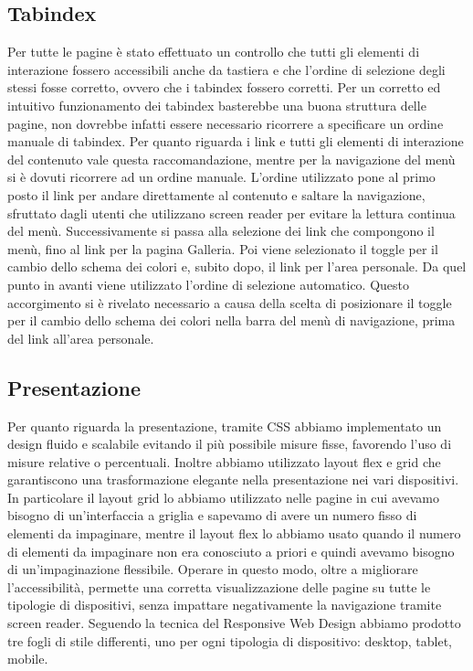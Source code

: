 \documentclass[a4paper]{article}
\begin{document}
	\subsection{Tabindex}
	Per tutte le pagine è stato effettuato un controllo che tutti gli elementi di interazione fossero accessibili anche da tastiera e che l'ordine di selezione degli stessi fosse corretto, ovvero che i tabindex fossero corretti. Per un corretto ed intuitivo funzionamento dei tabindex basterebbe una buona struttura delle pagine, non dovrebbe infatti essere necessario ricorrere a specificare un ordine manuale di tabindex. Per quanto riguarda i link e tutti gli elementi di interazione del contenuto vale questa raccomandazione, mentre per la navigazione del menù si è dovuti ricorrere ad un ordine manuale. L'ordine utilizzato pone al primo posto il link per andare direttamente al contenuto e saltare la navigazione, sfruttato dagli utenti che utilizzano screen reader per evitare la lettura continua del menù. Successivamente si passa alla selezione dei link che compongono il menù, fino al link per la pagina Galleria. Poi viene selezionato il toggle per il cambio dello schema dei colori e, subito dopo, il link per l'area personale. Da quel punto in avanti viene utilizzato l'ordine di selezione automatico. Questo accorgimento si è rivelato necessario a causa della scelta di posizionare il toggle per il cambio dello schema dei colori nella barra del menù di navigazione, prima del link all'area personale.

	\subsection{Presentazione}
	Per quanto riguarda la presentazione, tramite CSS abbiamo implementato un design fluido e scalabile evitando il più possibile misure fisse, favorendo l'uso di misure relative o percentuali. Inoltre abbiamo utilizzato layout flex e grid che garantiscono una trasformazione elegante nella presentazione nei vari dispositivi. In particolare il layout grid lo abbiamo utilizzato nelle pagine in cui avevamo bisogno di un'interfaccia a griglia e sapevamo di avere un numero fisso di elementi da impaginare, mentre il layout flex lo abbiamo usato quando il numero di elementi da impaginare non era conosciuto a priori e quindi avevamo bisogno di un'impaginazione flessibile. Operare in questo modo, oltre a migliorare l'accessibilità, permette una corretta visualizzazione delle pagine su tutte le tipologie di dispositivi, senza impattare negativamente la navigazione tramite screen reader. Seguendo la tecnica del Responsive Web Design abbiamo prodotto tre fogli di stile differenti, uno per ogni tipologia di dispositivo: desktop, tablet, mobile.
\end{document}
